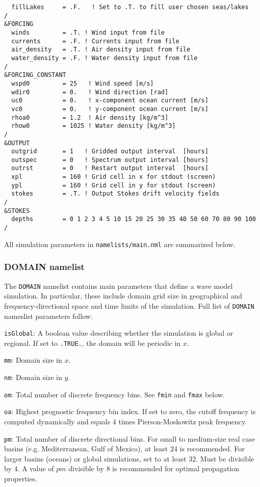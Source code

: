 \documentclass[letterpaper]{article}
\numberwithin{equation}{section}
\begin{document}
\begin{verbatim}
  fillLakes     = .F.   ! Set to .T. to fill user chosen seas/lakes
/
&FORCING
  winds         = .T. ! Wind input from file
  currents      = .F. ! Currents input from file
  air_density   = .T. ! Air density input from file
  water_density = .F. ! Water density input from file
/
&FORCING_CONSTANT
  wspd0         = 25   ! Wind speed [m/s]
  wdir0         = 0.   ! Wind direction [rad]
  uc0           = 0.   ! x-component ocean current [m/s]
  vc0           = 0.   ! y-component ocean current [m/s]
  rhoa0         = 1.2  ! Air density [kg/m^3]
  rhow0         = 1025 ! Water density [kg/m^3]
/
&OUTPUT
  outgrid       = 1   ! Gridded output interval  [hours]
  outspec       = 0   ! Spectrum output interval [hours]
  outrst        = 0   ! Restart output interval  [hours]
  xpl           = 160 ! Grid cell in x for stdout (screen)
  ypl           = 160 ! Grid cell in y for stdout (screen)
  stokes        = .T. ! Output Stokes drift velocity fields
/
&STOKES
  depths        = 0 1 2 3 4 5 10 15 20 25 30 35 40 50 60 70 80 90 100
/

\end{verbatim}

All simulation parameters in \verb+namelists/main.nml+ are 
summarized below.

\subsubsection{DOMAIN namelist}

The \verb+DOMAIN+ namelist contains main parameters that define 
a wave model simulation.
In particular, these include domain grid size in geographical 
and frequency-directional space and time limits of the simulation.
Full list of \verb+DOMAIN+ nameslist parameters follow.

\verb+isGlobal+: 
A boolean value describing whether the simulation is global or regional.
If set to \verb+.TRUE.+, the domain will be periodic in $x$.

\verb+mm+:
Domain size in $x$.

\verb+nm+:
Domain size in $y$.

\verb+om+:
Total number of discrete frequency bins.
See \verb+fmin+ and \verb+fmax+ below.

\verb+oa+:
Highest prognostic frequency bin index. If set to zero, the cutoff
frequency is computed dynamically and equals 4 times Pierson-Moskowitz peak frequency.

\verb+pm+:
Total number of discrete directional bins.
For small to medium-size real case basins (e.g. Mediterranean, Gulf of Mexico), 
at least $24$ is recommended.
For larger basins (oceans) or global simulations, set to at least $32$.
Must be divisible by $4$.
A value of $pm$ divisible by $8$ is recommended for optimal propagation properties.
 
\end{document}

